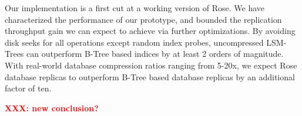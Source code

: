\documentclass{vldb}
\newcommand{\rows}{Rose\xspace}
\newcommand{\xxx}[1]{\textcolor{red}{\bf XXX: #1}}
\begin{document}
Our implementation is a first cut at a working version of \rows.
We have characterized the performance of our prototype, and
bounded the replication throughput gain we can expect to achieve via further
optimizations.  By avoiding disk seeks for all operations except
random index probes, uncompressed LSM-Trees can outperform
B-Tree based indices by at least 2 orders of magnitude.  With real-world
database compression ratios ranging from 5-20x, we expect \rows
database replicas to outperform B-Tree based database replicas by an
additional factor of ten.

\xxx{new conclusion?}


%
%
\balancecolumns %
\end{document}
